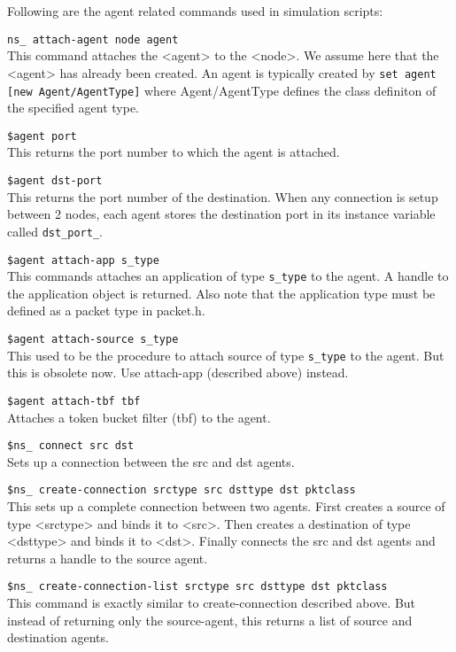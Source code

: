 Following are the agent related commands used in simulation scripts:
\begin{flushleft}
{\tt ns\_ attach-agent \<node\> \<agent\>}\\
This command attaches the <agent> to the <node>. We assume here that the
<agent> has already been created. An agent is typically created by
{\tt set agent [new Agent/AgentType]}
where Agent/AgentType defines the class definiton of the specified agent
type.


{\tt \$agent port}\\
This returns the port number to which the agent is attached.


{\tt \$agent dst-port}\\
This returns the port number of the destination.
When any connection is setup between 2 nodes, each agent stores the 
destination port in its instance variable called {\tt dst\_port\_}.


{\tt \$agent attach-app \<s\_type\>}\\
This commands attaches an application of type {\tt \<s\_type\>} to the agent.
A handle to the application object is returned. Also note that the application
type must be defined as a packet type in packet.h.


{\tt \$agent attach-source \<s\_type\>}\\
This used to be the procedure to attach source of type {\tt \<s\_type\>} to
the agent. But this is obsolete now. Use attach-app (described above)
instead.


{\tt \$agent attach-tbf \<tbf\>}\\
Attaches a token bucket filter (tbf) to the agent.


{\tt \$ns\_ connect \<src\> \<dst\>}\\
Sets up a connection between the src and dst agents. 


{\tt \$ns\_ create-connection \<srctype\> \<src\> \<dsttype\> \<dst\> \<pktclass\>}\\
This sets up a complete connection between two agents. First creates a source
of type <srctype> and binds it to <src>. Then creates a destination of type
<dsttype> and binds it to <dst>. Finally connects the src and dst agents and
returns a handle to the source agent.


{\tt \$ns\_ create-connection-list \<srctype\> \<src\> \<dsttype\> \<dst\> \<pktclass\>}\\
This command is exactly similar to create-connection described above. But
instead of returning only the source-agent, this returns a list of source and
destination agents.



\end{flushleft}
